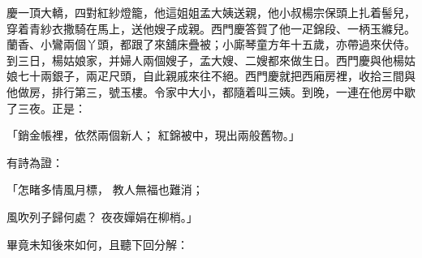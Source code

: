 \begin{showcontents}{}
慶一頂大轎，四對紅紗燈籠，他這姐姐孟大姨送親，他小叔楊宗保頭上扎着髻兒，穿着青紗衣撒騎在馬上，送他嫂子成親。西門慶答賀了他一疋錦段、一柄玉縧兒。蘭香、小鸞兩個丫頭，都跟了來舖床疊被；小廝琴童方年十五歲，亦帶過來伏侍。到三日，楊姑娘家，并婦人兩個嫂子，孟大嫂、二嫂都來做生日。西門慶與他楊姑娘七十兩銀子，兩疋尺頭，自此親戚來往不絕。西門慶就把西廂房裡，收拾三間與他做房，排行第三，號玉樓。令家中大小，都隨着叫三姨。到晚，一連在他房中歇了三夜。正是：

「銷金帳裡，依然兩個新人；  紅錦被中，現出兩般舊物。」

有詩為證：

「怎睹多情風月標，  教人無福也難消；

風吹列子歸何處？  夜夜嬋娟在柳梢。」

畢竟未知後來如何，且聽下回分解：



\end{showcontents}
